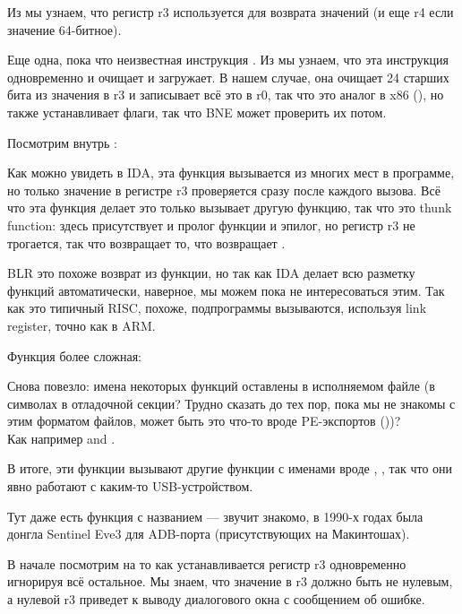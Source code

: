 Из \PPCABI мы узнаем, что регистр r3 используется для возврата
значений (и еще r4 если значение 64-битное).

Еще одна, пока что неизвестная инструкция . 
Из \PPC мы узнаем, что эта инструкция одновременно и очищает и загружает. 
В нашем случае, она очищает 24 старших бита из значения в r3 и записывает всё это в r0, 
так что это аналог \MOVZX в x86 (),
но также устанавливает флаги, так что \ac{BNE} 
может проверить их потом.

Посмотрим внутрь :



Как можно увидеть в \ac{IDA}, эта функция вызывается из многих мест в программе, но только значение
в регистре r3 проверяется сразу после каждого вызова.
Всё что эта функция делает это только вызывает другую функцию, так что это \gls{thunk function}: 
здесь присутствует и пролог функции и эпилог, но регистр r3 не трогается, так что  
возвращает то, что возвращает .

\ac{BLR} это похоже возврат из функции, но так как IDA делает всю разметку функций автоматически,
наверное, мы можем пока не интересоваться этим.
Так как это типичный \ac{RISC}, похоже, подпрограммы вызываются, используя \gls{link register}, точно как в ARM.

Функция  более сложная:



Снова повезло: имена некоторых функций оставлены в исполняемом файле
(в символах в отладочной секции? Трудно сказать до тех пор, пока мы не знакомы с этим форматом файлов,
может быть это что-то вроде PE-экспортов ())?\\
Как например  and .

В итоге, эти функции вызывают другие функции с именами вроде , 
,
так что они явно работают с каким-то USB-устройством.

Тут даже есть функция с названием 
 --- звучит знакомо, в 1990-х годах была донгла Sentinel Eve3 
для ADB-порта (присутствующих на Макинтошах).

В начале посмотрим на то как устанавливается регистр r3 одновременно игнорируя всё остальное.
Мы знаем, что  значение в r3 должно быть не нулевым, а нулевой r3 приведет
к выводу диалогового окна с сообщением об ошибке.

